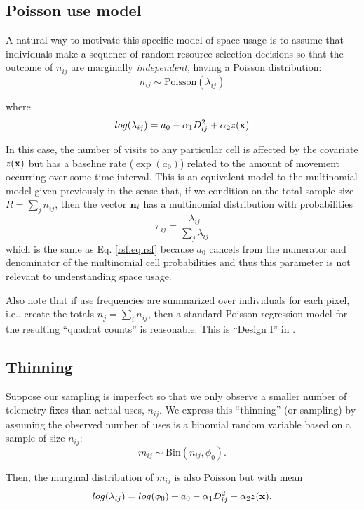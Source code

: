 \documentclass[12pt]{article}
\begin{document}
\subsection{Poisson use model}

A natural way to motivate this specific model of space usage is to
assume that individuals make a sequence of random resource selection
decisions so that the outcome of $n_{ij}$ are marginally {\it
  independent}, having a Poisson distribution:
\[
 n_{ij} \sim \mbox{Poisson}( \lambda_{ij})
\]

{\flushleft where }
\[
 log(\lambda_{ij}) = a_{0} -\alpha_{1} D_{ij}^{2} +  \alpha_{2} z({\bf x})
\]

{\flushleft In} this case, the number of visits to any particular cell is affected
by the covariate $z({\bf x})$ but has a baseline rate ($\exp(a_{0})$)
related to the amount of movement occurring over some time interval.
This is an equivalent model to the multinomial
model given previously in the sense that, if we condition on the total
sample size $R = \sum_{j} n_{ij}$, then the vector ${\bf n}_{i}$
has a multinomial distribution with probabilities
\[
 \pi_{ij} = \frac{\lambda_{ij}}{ \sum_{j} \lambda_{ij}}
\]
which is the same as Eq. \ref{rsf.eq.rsf} 
 because $a_{0}$ cancels
from the numerator and denominator of the
multinomial cell probabilities
and thus this parameter is not relevant to understanding
space usage.

Also note that if use frequencies are summarized over individuals for
each pixel, i.e., 
create the totals $n_j = \sum_i n_{ij}$, then 
 a standard Poisson regression model for the resulting  ``quadrat
 counts'' is reasonable. This is ``Design I'' in \citet{manly_etal:2002}.

\subsection{Thinning}

Suppose our sampling is imperfect so that we only observe a smaller
number of telemetry fixes than actual uses, $n_{ij}$.
We express this ``thinning'' (or sampling) by assuming the observed number of
uses is a binomial random variable based on a sample of size $n_{ij}$:
\[
 m_{ij} \sim \mbox{Bin}(n_{ij}, \phi_{0}).
\]

{\flushleft Then}, the marginal distribution of $m_{ij}$ is also Poisson
but with mean
\[
 log(\lambda_{ij}) = log(\phi_{0}) + a_{0} -\alpha_{1} D_{ij}^{2} +  \alpha_{2} z({\bf x}).
\]
\end{document}

